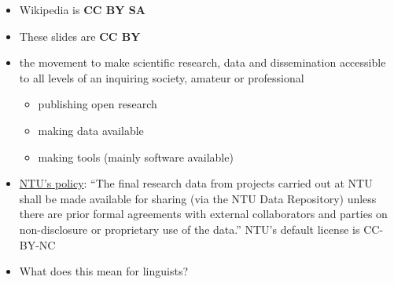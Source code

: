 \documentclass[a4paper,landscape,headrule,footrule,xetex]{foils}
\begin{document}
\begin{itemize}
\item Wikipedia is \textbf{CC BY SA}
\item These slides are \textbf{CC BY}
\end{itemize}



\begin{itemize}
\item the movement to make scientific research, data and dissemination accessible to all levels of an inquiring society, amateur or professional
  \begin{itemize}
  \item publishing open research
  \item making data available
  \item making tools (mainly software available)
  \end{itemize}
\item \href{http://research.ntu.edu.sg/rieo/RI/Pages/Research-Data-Policies.aspx}{NTU's policy}: ``The final research data from projects carried out
  at NTU shall be made available for sharing (via the NTU Data
  Repository) unless there are prior formal agreements with external
  collaborators and parties on non-disclosure or proprietary use of
  the data.''  NTU's default license is CC-BY-NC 
\item What does this mean for linguists?
\end{itemize}
\end{document}
